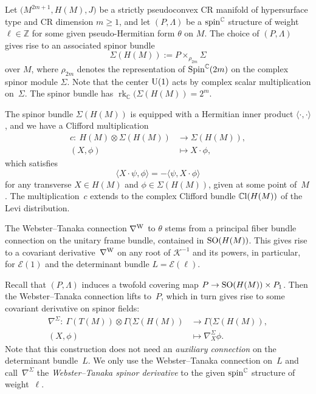 \documentclass[pdftex]{sigma}
\numberwithin{equation}{section}
\newcommand{\ZZ}{\mathbb{Z}}
\newcommand{\CC}{\mathbb{C}}
\begin{document}
Let $\big(M^{2m+1},H(M),J\big)$ be a strictly pseudoconvex CR manifold of hypersurface type and CR dimension $m\geq 1$,
and let $(P,\Lambda)$ be a ${\rm spin}^\CC$ structure of weight $\ell\in\ZZ$ for some given pseudo-Hermitian form $\theta$ on $M$.
The choice of $(P,\Lambda)$ gives rise to an
associated spinor bundle
\[ \Sigma(H(M)) := P\times_{\rho_{2m}}\Sigma\]
over $M$, where $\rho_{2m}$ denotes the representation of ${\rm Spin}^\CC(2m)$ on the complex spinor module $\Sigma$.
Note that the center ${\rm U}(1)$ acts by complex scalar multiplication on~$\Sigma$.
The spinor bundle has $\operatorname{rk}_\CC(\Sigma(H(M))=2^m$.

The spinor bundle $\Sigma(H(M))$ is equipped with a Hermitian inner product $\langle\cdot,\cdot\rangle$, and we have a Clifford multiplication
\begin{align*}
c \colon \ H(M) \otimes \Sigma(H(M)) &\to \Sigma(H(M)),\\
 (X,\phi) &\mapsto X\cdot \phi,
\end{align*}
which satisfies
\[
\langle X\cdot \psi,\phi\rangle = -\langle \psi,X\cdot \phi\rangle
\]
for any transverse $X\in H(M)$ and $\phi\in\Sigma(H(M))$, given at some point of~$M$.
The multiplica\-tion~$c$ extends to the complex Clifford bundle $\CC{\rm l}(H(M))$ of the Levi distribution.

The Webster--Tanaka connection $\nabla^{\rm W}$ to $\theta$ stems from a principal fiber bundle
connection on the unitary frame bundle, contained in ${\rm SO}(H(M))$. This gives rise to a covariant derivative~$\nabla^{\rm W}$
on any root of $\mathcal{K}^{-1}$ and its powers,
in particular, for $\mathcal{E}(1)$ and the determinant bundle $L=\mathcal{E}(\ell)$.

Recall that $(P,\Lambda)$ induces a twofold covering map $P\to {\rm SO}(H(M))\times P_1$.
Then the Webster--Tanaka connection lifts to~$P$, which in turn gives rise to some covariant derivative on spinor
fields:
\begin{align*}
\nabla^\Sigma \colon \ \Gamma(T(M)) \otimes \Gamma(\Sigma(H(M))&\to \Gamma(\Sigma(H(M)),\\
 (X,\phi) &\mapsto \nabla^\Sigma_X\phi.
\end{align*}
Note that this construction does not need an {\em auxiliary connection} on the determinant bundle~$L$.
We only use the Webster--Tanaka connection on~$L$ and call~$\nabla^\Sigma$
the {\em Webster--Tanaka spinor derivative} to the given ${\rm spin}^\CC$ structure of weight~$\ell$.
\end{document}
